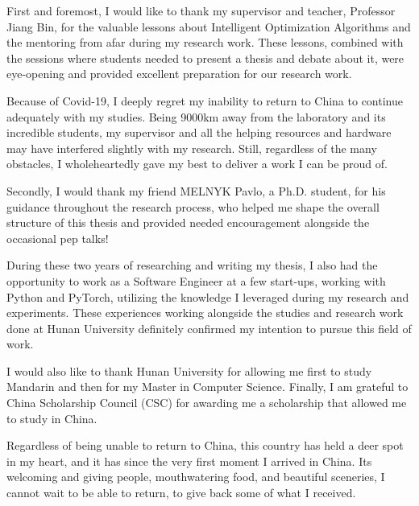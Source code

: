 \begin{acknowledgements}
	First and foremost, I would like to thank my supervisor and teacher,
	Professor Jiang Bin, for the valuable lessons about Intelligent Optimization
	Algorithms and the mentoring from afar during my research work. These
	lessons, combined with the sessions where students needed to present a
	thesis and debate about it, were eye-opening and provided excellent
	preparation for our research work.

	Because of Covid-19, I deeply regret my inability to return to China to
	continue adequately with my studies. Being 9000km away from the laboratory
	and its incredible students, my supervisor and all the helping resources and
	hardware may have interfered slightly with my research. Still, regardless of
	the many obstacles, I wholeheartedly gave my best to deliver a work I can be
	proud of.

	Secondly, I would thank my friend MELNYK Pavlo, a Ph.D. student, for his
	guidance throughout the research process, who helped me shape the overall
	structure of this thesis and provided needed encouragement alongside the
	occasional pep talks!

	During these two years of researching and writing my thesis, I also had the
	opportunity to work as a Software Engineer at a few start-ups, working with
	Python and PyTorch, utilizing the knowledge I leveraged during my research and
	experiments. These experiences working alongside the studies and research work
	done at Hunan University definitely confirmed my intention to pursue this field
	of work.

	I would also like to thank Hunan University for allowing me first to study
	Mandarin and then for my Master in Computer Science. Finally, I am grateful
	to China Scholarship Council (CSC) for awarding me a scholarship that
	allowed me to study in China.

	Regardless of being unable to return to China, this country has held a deer
	spot in my heart, and it has since the very first moment I arrived in China.
	Its welcoming and giving people, mouthwatering food, and beautiful
	sceneries, I cannot wait to be able to return, to give back some of what I
	received.
\end{acknowledgements}
